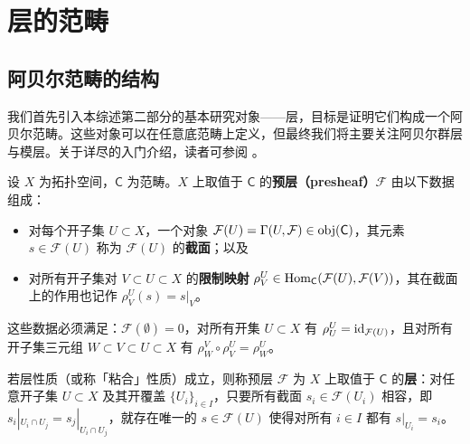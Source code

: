 \section{层的范畴}
\thispagestyle{plain}



\subsection{阿贝尔范畴的结构}\label{ch5.1}


我们首先引入本综述第二部分的基本研究对象——层，目标是证明它们构成一个阿贝尔范畴。这些对象可以在任意底范畴上定义，但最终我们将主要关注阿贝尔群层与模层。关于详尽的入门介绍，读者可参阅 \cite[section II.1]{[Har77]}。

\begin{Def}									%
设 $X$ 为拓扑空间，$\mathsf{C}$ 为范畴。$X$ 上取值于 $\mathsf{C}$ 的\textbf{预层（presheaf）$\mathcal{F}$} 由以下数据组成：
\begin{itemize}[leftmargin=0.5cm]
	\item 对每个开子集 $U\subset X$，一个对象 $\mathcal{F}(U)=\Gamma(U,\mathcal{F})\in\textup{obj}(\mathsf{C})$，其元素 $s\in\mathcal{F}(U)$ 称为 $\mathcal{F}(U)$ 的\textbf{截面}；以及
	\item 对所有开子集对 $V\subset U\subset X$ 的\textbf{限制映射} $\rho^U_V\in\textup{Hom}_\mathsf{C}(\mathcal{F}(U),\mathcal{F}(V))$，其在截面上的作用也记作 $\rho^U_V(s)=s|_V$。
\end{itemize}
这些数据必须满足：$\mathcal{F}(\emptyset)=0$，对所有开集 $U\subset X$ 有 $\rho_U^U=\textup{id}_{\mathcal{F}(U)}$，且对所有开子集三元组 $W\subset V\subset U\subset X$ 有 $\rho^V_W\circ\rho^U_V=\rho^U_W$。

若层性质（或称「粘合」性质）成立，则称预层 $\mathcal{F}$ 为 $X$ 上取值于 $\mathsf{C}$ 的\textbf{层}：对任意开子集 $U\subset X$ 及其开覆盖 $\{U_i\}_{i\in I}$，只要所有截面 $s_i\in\mathcal{F}(U_i)$ 相容，即 $s_i|_{U_i\cap U_j} = s_j|_{U_i\cap U_j}$，就存在唯一的 $s\in\mathcal{F}(U)$ 使得对所有 $i\in I$ 都有 $s|_{U_i}=s_i$。
\end{Def}

